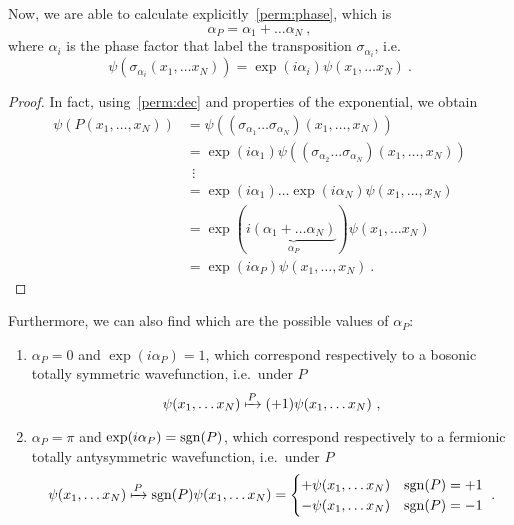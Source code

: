     Now, we are able to calculate explicitly~\eqref{perm:phase}, which is 
    \begin{equation}
        \alpha_P = \alpha_1 + \ldots \alpha_N~,
    \end{equation}
    where $\alpha_i$ is the phase factor that label the transposition $\sigma_{\alpha_i}$, i.e.
    \begin{equation*}
        \psi(\sigma_{\alpha_i}(x_1,\ldots x_N)) = \exp(i \alpha_i) \psi (x_1,\ldots x_N) ~.
    \end{equation*}
    \begin{proof}
        In fact, using~\eqref{perm:dec} and properties of the exponential, we obtain
        \begin{equation*}
        \begin{aligned}
            \psi(P(x_1,\ldots, x_N)) & = \psi((\sigma_{\alpha_1} \ldots \sigma_{\alpha_N}) (x_1,\ldots, x_N)) \\ & = \exp (i \alpha_1) \psi((\sigma_{\alpha_2} \ldots \sigma_{\alpha_N}) (x_1,\ldots, x_N)) \\ & ~~ \vdots \\ & = \exp (i \alpha_1) \ldots \exp (i \alpha_N) \psi(x_1,\ldots, x_N) \\ & = \exp (i \underbrace{(\alpha_1 + \ldots \alpha_N)}_{\alpha_P}) \psi(x_1,\ldots x_N) \\ &  = \exp (i \alpha_P) \psi(x_1,\ldots, x_N) ~.
        \end{aligned}
        \end{equation*}
    \end{proof}
    Furthermore, we can also find which are the possible values of $\alpha_P$:
    \begin{enumerate}
        \item $\alpha_P = 0$ and $\exp(i \alpha_P) = 1$, which correspond respectively to a bosonic totally symmetric wavefunction, i.e.~under $P$
        \begin{equation*}
            \psi(x_1, \ldots x_N) \xmapsto{P} (+ 1) \psi(x_1, \ldots x_N) ~,
        \end{equation*}
        \item $\alpha_P = \pi$ and $\exp(i \alpha_P) = \operatorname{sgn}(P)$, which correspond respectively to a fermionic totally antysymmetric wavefunction, i.e.~under $P$
        \begin{equation*}
            \psi(x_1, \ldots x_N) \xmapsto{P} \operatorname{sgn}(P) \psi(x_1, \ldots x_N) = \begin{cases}
                + \psi(x_1, \ldots x_N) & \operatorname{sgn}(P) = +1 \\
                - \psi(x_1, \ldots x_N) & \operatorname{sgn}(P) = - 1 \\
            \end{cases} ~.
        \end{equation*}
    \end{enumerate}
